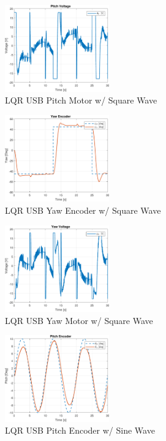 \documentclass[letterpaper, 10pt, conference]{ieeeconf}
\begin{document}
\begin{figure}
  \centering
  \includegraphics[width=0.4\textwidth]{figs/matlab/LQR/Pitch_Volt_LQR_USB_SQU}
  \caption{LQR USB Pitch Motor w/ Square Wave}
  \label{fig:Pitch_Volt_LQR_USB_SQU}
\end{figure}

\begin{figure}
  \centering
  \includegraphics[width=0.4\textwidth]{figs/matlab/LQR/Yaw_Pos_LQR_USB_SQU}
  \caption{LQR USB Yaw Encoder w/ Square Wave}
  \label{fig:Yaw_Pos_LQR_USB_SQU}
\end{figure}

\begin{figure}
  \centering
  \includegraphics[width=0.4\textwidth]{figs/matlab/LQR/Yaw_Volt_LQR_USB_SQU}
  \caption{LQR USB Yaw Motor w/ Square Wave}
  \label{fig:Yaw_Volt_LQR_USB_SQU}
\end{figure}

\begin{figure}
  \centering
  \includegraphics[width=0.4\textwidth]{figs/matlab/LQR/Pitch_Pos_LQR_USB_SIN}
  \caption{LQR USB Pitch Encoder w/ Sine Wave}
  \label{fig:Pitch_Pos_LQR_USB_SIN}
\end{figure}
\end{document}
